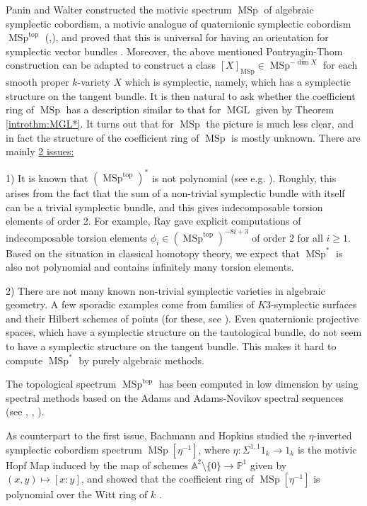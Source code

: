 \documentclass[10pt]{amsart}
\theoremstyle{definition}
\theoremstyle{plain}
\numberwithin{equation}{section}
\newcommand{\0}{\emptyset}
\newcommand{\A}{{\mathbb A}}
\renewcommand{\P}{{\mathbb P}}
\newcommand{\MGL}{{\operatorname{MGL}}}
\newcommand{\MSp}{{\operatorname{MSp}}}
\renewcommand{\dim}{{\operatorname{dim}}}
\renewcommand{\top}{{\operatorname{top}}}
\begin{document}
Panin and Walter \cite[Section 6]{Panwal-cobordism} constructed the motivic spectrum $\MSp$ of algebraic symplectic cobordism, a motivic analogue of quaternionic symplectic cobordism $\MSp^\top$ (\cite{Thomcompl},\cite[Chapter 1, Section 5]{C-F:Cobordism}), and proved that this is universal for having an orientation for symplectic vector bundles \cite[Theorem 4.5]{Panwal-cobordism}. Moreover, the above mentioned Pontryagin-Thom construction can be adapted to construct a class $[X]_\MSp \in \MSp^{-\dim X}$ for each smooth proper $k$-variety $X$ which is symplectic, namely, which has a symplectic structure on the tangent bundle. It is then natural to ask whether the coefficient ring of $\MSp$ has a description similar to that for $\MGL$ given by Theorem \ref{introthm:MGL*}. It turns out that for $\MSp$ the picture is much less clear, and in fact the structure of the coefficient ring of $\MSp$ is mostly unknown. There are mainly \underline{2 issues:}

1) It is known that $(\MSp^\top)^*$ is not polynomial (see e.g. \cite{Ray:SymplBordism}). Roughly, this arises from the fact that the sum of a non-trivial symplectic bundle with itself can be a trivial symplectic bundle, and this gives indecomposable torsion elements of order 2. For example, Ray \cite{Ray:Tors} gave explicit computations of indecomposable torsion elements $\phi_i \in (\MSp^\top)^{-8i+3}$ of order $2$ for all $i\ge 1$. Based on the situation in classical homotopy theory, we expect that $\MSp^*$ is also not polynomial and contains infinitely many torsion elements.

2) There are not many known non-trivial symplectic varieties in algebraic geometry. A few sporadic examples come from families of $K3$-symplectic surfaces and their Hilbert schemes of points (for these, see \cite{Beauville:K3}). Even quaternionic projective spaces, which have a symplectic structure on the tautological bundle, do not seem to have a symplectic structure on the tangent bundle. This makes it hard to compute $\MSp^*$ by purely algebraic methods. 

The topological spectrum $\MSp^\top$ has been computed in low dimension by using spectral methods based on the Adams and Adams-Novikov spectral sequences (see \cite{Ray:SymplBordism}, \cite{kochman:symplectic}, \cite{Anisimov:MSp}).

As counterpart to the first issue, Bachmann and Hopkins \cite{Bachmann:eta-periodic} studied the $\eta$-inverted symplectic cobordism spectrum $\MSp[\eta^{-1}]$, where $\eta:\Sigma^{1,1}1_k \to 1_k$ is the motivic Hopf Map induced by the map of schemes $\A^2\setminus \{0\}\to \P^1$ given by $(x,y)\mapsto[x:y]$, and showed that the coefficient ring of $\MSp[\eta^{-1}]$ is polynomial over the Witt ring of $k$ \cite[Theorem 8.7]{Bachmann:eta-periodic}. 
\end{document}

